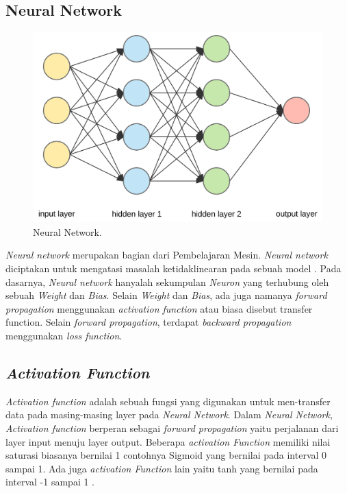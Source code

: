 \subsection{Neural Network}
\label{sec:nn}
\begin{figure}[H]
    \centering
  
    \includegraphics[scale=0.20]{gambar/nn.png}
  
    \caption{Neural Network.}
    \label{fig:nn}
\end{figure}
\emph{Neural network} merupakan bagian dari Pembelajaran Mesin. 
\emph{Neural network} diciptakan untuk mengatasi masalah ketidaklinearan 
pada sebuah model \parencite{ref_neural_network}. Pada dasarnya, 
\emph{Neural network} hanyalah sekumpulan \emph{Neuron} 
yang terhubung oleh sebuah \emph{Weight} dan \emph{Bias}. Selain 
\emph{Weight} dan \emph{Bias}, ada juga namanya \emph{forward propagation} 
menggunakan \emph{activation function} atau 
biasa disebut transfer function. Selain \emph{forward propagation},
 terdapat \emph{backward propagation} menggunakan \emph{loss function}. 

\subsection{\emph{Activation Function}}
\emph{Activation function} adalah sebuah fungsi yang digunakan untuk men-transfer 
data pada masing-masing layer pada \emph{Neural Network}. 
Dalam \emph{Neural Network}, \emph{Activation function} berperan sebagai 
\emph{forward propagation} yaitu perjalanan dari layer input menuju 
layer output. Beberapa \emph{activation Function} memiliki nilai 
saturasi biasanya bernilai 1 contohnya Sigmoid yang bernilai 
pada interval 0 sampai 1. Ada juga \emph{activation Function} lain yaitu 
tanh yang bernilai pada interval -1 sampai 1 \parencite{ref_activation_function}.

